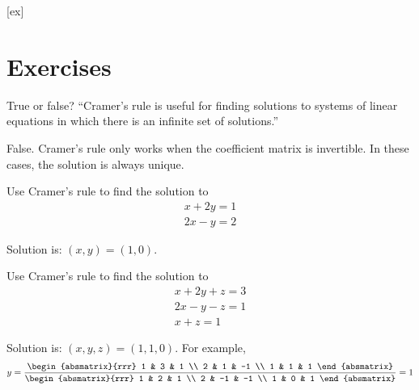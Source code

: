 [ex]
\section*{Exercises}

\begin{enumialphparenastyle}

\begin{ex}
  True or false? ``Cramer's rule is useful for finding solutions
    to systems of linear equations in which there is an infinite set
    of solutions.''
  \begin{sol}
    False. Cramer's rule only works when the coefficient matrix is
    invertible. In these cases, the solution is always unique.
  \end{sol}
\end{ex}

\begin{ex}
  Use Cramer's rule to find the solution to
  \begin{equation*}
    \begin{array}{c}
      x+2y=1 \\
      2x-y=2
    \end{array}
  \end{equation*}
  \begin{sol}
    Solution is: $(x,y) = (1,0)$.
  \end{sol}
\end{ex}

\begin{ex}
  Use Cramer's rule to find the solution to
  \begin{equation*}
    \begin{array}{c}
      x+2y+z=3 \\
      2x-y-z=1 \\
      x+z=1
    \end{array}
  \end{equation*}
  \begin{sol}
    Solution is: $(x,y,z) = (1,1,0)$. For example,
    \begin{equation*}
      y=\frac{\begin{absmatrix}{rrr}
          1 & 3 & 1 \\
          2 & 1 & -1 \\
          1 & 1 & 1
        \end{absmatrix}}{\begin{absmatrix}{rrr}
          1 & 2 & 1 \\
          2 & -1 & -1 \\
          1 & 0 & 1
        \end{absmatrix}}=1
    \end{equation*}
  \end{sol}
\end{ex}


\end{enumialphparenastyle}
